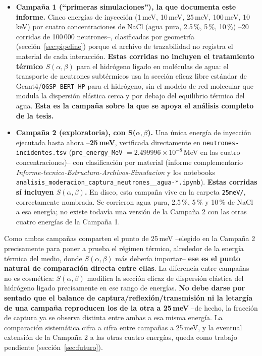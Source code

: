 \documentclass[11pt,a4paper]{article}
\newcommand{\codigo}[1]{\nolinkurl{#1}}
\newcommand{\var}[1]{\texttt{#1}}
\begin{document}
\begin{itemize}
  \item \textbf{Campaña 1 (``primeras simulaciones''), la que documenta este informe.} Cinco energías de inyección (1\,meV, 10\,meV, 25\,meV, 100\,meV, 10\,keV) por cuatro concentraciones de NaCl (agua pura, 2.5\,\%, 5\,\%, 10\,\%) --20 corridas de 100\,000 neutrones--, clasificadas por geometría (sección~\ref{sec:pipeline}) porque el archivo de trazabilidad no registra el material de cada interacción. \textbf{Estas corridas no incluyen el tratamiento térmico $S(\alpha,\beta)$} para el hidrógeno ligado en moléculas de agua: el transporte de neutrones subtérmicos usa la sección eficaz libre estándar de Geant4/\codigo{QGSP\_BERT\_HP} para el hidrógeno, sin el modelo de red molecular que modula la dispersión elástica cerca y por debajo del equilibrio térmico del agua. \textbf{Esta es la campaña sobre la que se apoya el análisis completo de la tesis.}
  \item \textbf{Campaña 2 (exploratoria), con S($\alpha,\beta$).} Una única energía de inyección ejecutada hasta ahora --\textbf{25\,meV}, verificada directamente en \codigo{neutrones-incidentes.tsv} (\var{pre\_energy\_MeV} $=2.499996\times10^{-8}$\,MeV en las cuatro concentraciones)-- con clasificación por material (informe complementario \textit{Informe-tecnico-Estructura-Archivos-Simulacion} y los notebooks \codigo{analisis\_moderacion\_captura\_neutrones\_\_agua-*.ipynb}). \textbf{Estas corridas sí incluyen $S(\alpha,\beta)$.} En disco, esta campaña vive en la carpeta \codigo{25meV/}, correctamente nombrada. Se corrieron agua pura, 2.5\,\%, 5\,\% y 10\,\% de NaCl a esa energía; no existe todavía una versión de la Campaña 2 con las otras cuatro energías de la Campaña 1.
\end{itemize}

Como ambas campañas comparten el punto de 25\,meV --elegido en la Campaña 2 precisamente para poner a prueba el régimen térmico, alrededor de la energía térmica del medio, donde $S(\alpha,\beta)$ más debería importar-- \textbf{ese es el punto natural de comparación directa entre ellas}. La diferencia entre campañas no es cosmética: $S(\alpha,\beta)$ modifica la sección eficaz de dispersión elástica del hidrógeno ligado precisamente en ese rango de energías. \textbf{No debe darse por sentado que el balance de captura/reflexión/transmisión ni la letargía de una campaña reproducen los de la otra a 25\,meV} --de hecho, la fracción de captura ya se observa distinta entre ambas a esa misma energía. La comparación sistemática cifra a cifra entre campañas a 25\,meV, y la eventual extensión de la Campaña 2 a las otras cuatro energías, queda como trabajo pendiente (sección~\ref{sec:futuro}).
\end{document}
